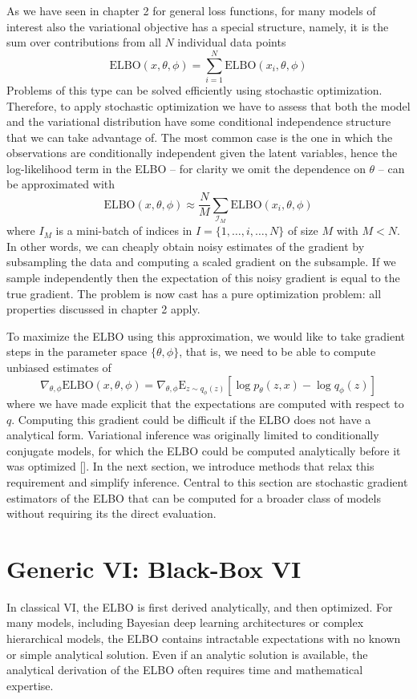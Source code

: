 As we have seen in chapter 2 for general loss functions, for many models of interest also the variational objective has a special structure, namely, it is the sum over contributions from all $N$ individual data points
$$\mathrm{ELBO}(x,\theta,\phi) = \sum_{i=1}^{N} \mathrm{ELBO}(x_i, \theta, \phi)$$
Problems of this type can be solved efficiently using stochastic optimization. Therefore, to apply stochastic optimization we have to assess that both the model and the variational distribution have some conditional independence structure that we can take advantage of. The most common case is the one in which the observations are conditionally independent given the latent variables, hence the log-likelihood term in the ELBO -- for clarity we omit the dependence on $\theta$ -- can be approximated with 
$$\mathrm{ELBO}(x,\theta,\phi) \approx \frac{N}{M}\sum_{\mathcal{I}_M} \mathrm{ELBO}(x_i, \theta, \phi)$$
where $I_M$ is a mini-batch of indices in $I = \{1,\dots,i,\dots,N\}$ of size $M$ with $M<N$. In other words, we can cheaply obtain noisy estimates of the gradient by subsampling the data and computing a scaled gradient on the subsample. If we sample independently then the expectation of this noisy gradient is equal to the true gradient. The problem is now cast has a pure optimization problem: all properties discussed in chapter 2 apply. 

To maximize the ELBO using this approximation, we would like to take gradient steps in the parameter space $\{\theta, \phi\}$, that is, we need to be able to compute unbiased estimates of
$$\nabla_{\theta,\phi} \mathrm{ELBO} (x, \theta, \phi) = \nabla_{\theta,\phi} \mathrm{E}_{z\sim q_\phi(z)}\left[\log p_\theta(z, x) - \log q_\phi(z)\right]$$
where we have made explicit that the expectations are computed with respect to $q$. Computing this gradient could be difficult if the ELBO does not have a  analytical form. Variational inference was originally limited to conditionally conjugate models, for which the ELBO could be computed analytically before it was optimized [\cite{Hoffman2013}]. In the next section, we introduce methods that relax this requirement and simplify inference. Central to this section are stochastic gradient estimators of the ELBO that can be computed for a broader class of models without requiring its the direct evaluation.




\section{Generic VI: Black-Box VI}\label{sec:generic VI}
In classical VI, the ELBO is first derived analytically, and then optimized. For many models, including Bayesian deep learning architectures or complex hierarchical models, the ELBO contains intractable expectations with no known or simple analytical solution. Even if an analytic solution is available, the analytical derivation of the ELBO often requires time and mathematical expertise.


